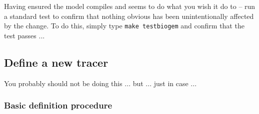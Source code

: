 \documentclass[11pt,fleqn]{book} %
\begin{document}
\noindent Having ensured the model compiles and seems to do what you wish it do to -- run a standard test to confirm that nothing obvious has been unintentionally affected by the change. To do this, simply type \texttt{make testbiogem} and confirm that the test passes ...

%
\subsection{Define a new tracer}\label{Define a new trace}

You probably should not be doing this ... but ... just in case ...

%
\subsubsection{Basic definition procedure}
\end{document}
